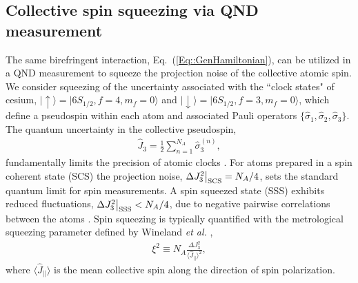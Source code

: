\documentclass[preprint, aps,pra,onecolumn]{revtex4-1} %
\def\ket#1{\lvert{#1}\rangle}%
\newcommand{\erf}[1]{Eq.~(\ref{#1})}
\newcommand{\expt}[1]{\langle{#1}\rangle}
\newcommand{\scs}{{\rm SCS}}
\newcommand{\varz}{\Delta J_3^2}
\newcommand{\jz}{\hat{J}_3}
\begin{document}
	\subsection{Collective spin squeezing via QND measurement}

The same birefringent interaction, \erf{Eq::GenHamiltonian}, can be utilized in a QND measurement to squeeze the projection noise of the collective atomic spin.  We consider squeezing of the uncertainty associated with the ``clock states" of cesium, $\ket{\uparrow} = \ket{6S_{1/2}, f=4, m_f=0}$ and $\ket{\downarrow} = \ket{6S_{1/2}, f=3, m_f=0}$, which define a pseudospin within each atom and associated Pauli operators $\{\hat{\sigma}_1, \hat{\sigma}_2, \hat{\sigma}_3\}$.  The quantum uncertainty in the collective pseudospin,
	\begin{align}
		\jz = \frac{1}{2} \sum_{n=1}^{N_A} \hat{\sigma}_3^{(n)},  
	\end{align}
fundamentally limits the precision of atomic clocks \cite{wineland_spin_1992}. For atoms prepared in a spin coherent state (SCS) the projection noise, $\varz \big|_{\scs} = N_A/4$, sets the standard quantum limit for spin measurements. A spin squeezed state (SSS) exhibits reduced fluctuations, $ \varz \big|_{\rm SSS}  < N_A/4$, due to negative pairwise correlations between the atoms \cite{kitagawa_squeezed_1993}. Spin squeezing is typically quantified with the metrological squeezing parameter defined by Wineland \emph{et al.} \cite{wineland_spin_1992},
	\begin{align} \label{Eq::SqueezingParameter}
		\xi^2 \equiv N_A \frac{ \varz }{ \expt{\hat{J}_{||}}^2 },
	\end{align}
where $\expt{\hat{J}_{||}}$ is the mean collective spin along the direction of spin polarization. 
\end{document}
